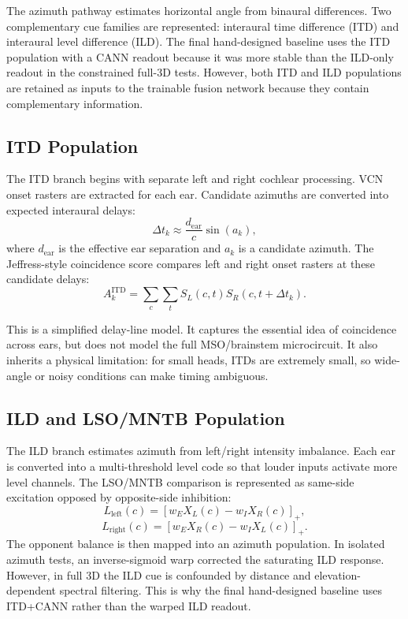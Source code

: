 The azimuth pathway estimates horizontal angle from binaural differences. Two complementary cue families are represented: interaural time difference (ITD) and interaural level difference (ILD). The final hand-designed baseline uses the ITD population with a CANN readout because it was more stable than the ILD-only readout in the constrained full-3D tests. However, both ITD and ILD populations are retained as inputs to the trainable fusion network because they contain complementary information.

\subsection{ITD Population}

The ITD branch begins with separate left and right cochlear processing. VCN onset rasters are extracted for each ear. Candidate azimuths are converted into expected interaural delays:
\begin{equation}
    \Delta t_k \approx \frac{d_{\text{ear}}}{c}\sin(a_k),
\end{equation}
where $d_{\text{ear}}$ is the effective ear separation and $a_k$ is a candidate azimuth. The Jeffress-style coincidence score compares left and right onset rasters at these candidate delays:
\begin{equation}
    A^{\text{ITD}}_k = \sum_c \sum_t S_L(c,t)S_R(c,t+\Delta t_k).
\end{equation}

This is a simplified delay-line model. It captures the essential idea of coincidence across ears, but does not model the full MSO/brainstem microcircuit. It also inherits a physical limitation: for small heads, ITDs are extremely small, so wide-angle or noisy conditions can make timing ambiguous.


\subsection{ILD and LSO/MNTB Population}

The ILD branch estimates azimuth from left/right intensity imbalance. Each ear is converted into a multi-threshold level code so that louder inputs activate more level channels. The LSO/MNTB comparison is represented as same-side excitation opposed by opposite-side inhibition:
\begin{equation}
    L_{\text{left}}(c) =
    \left[
        w_E X_L(c) - w_I X_R(c)
    \right]_+,
\end{equation}
\begin{equation}
    L_{\text{right}}(c) =
    \left[
        w_E X_R(c) - w_I X_L(c)
    \right]_+.
\end{equation}
The opponent balance is then mapped into an azimuth population. In isolated azimuth tests, an inverse-sigmoid warp corrected the saturating ILD response. However, in full 3D the ILD cue is confounded by distance and elevation-dependent spectral filtering. This is why the final hand-designed baseline uses ITD+CANN rather than the warped ILD readout.

